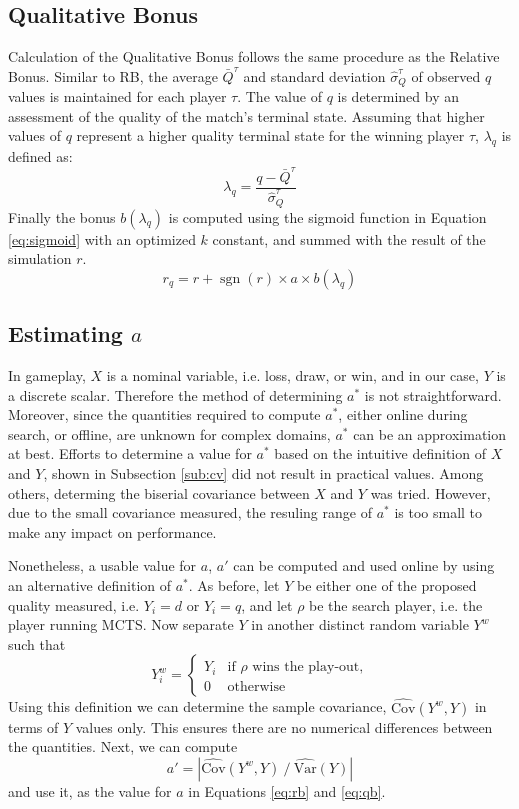 \documentclass{ecai2014}
\newcommand{\sgn}{\mathop{\mathrm{sgn}}}
\newcommand{\SVar}[1]{\mathrm{\widehat{Var}}\left( #1 \right)}
\newcommand{\SCov}[1]{\mathrm{\widehat{Cov}}\left( #1 \right)}
\begin{document}
\subsection{Qualitative Bonus}
\label{subsec:qb}
Calculation of the Qualitative Bonus follows the same procedure as the Relative Bonus. Similar to RB, the average $\bar{Q}^\tau$ and standard deviation $\hat{\sigma}^\tau_Q$ of observed $q$ values is maintained for each player $\tau$. The value of $q$ is determined by an assessment of the quality of the match's terminal state. Assuming that higher values of $q$ represent a higher quality terminal state for the winning player $\tau$, $\lambda_q$ is defined as:
\begin{equation}
\lambda_q = \frac{q - \bar{Q}^\tau}{\hat{\sigma}^\tau_Q}
\label{eq:qb_norm}
\end{equation}
Finally the bonus $b(\lambda_q)$ is computed using the sigmoid function in Equation \ref{eq:sigmoid} with an optimized $k$ constant, and summed with the result of the simulation $r$.
\begin{equation}
r_q=r+\sgn(r)\times a \times b(\lambda_q)
\label{eq:qb}
\end{equation}

\subsection{Estimating $a$}
\label{subsec:astar}
In gameplay, $X$ is a nominal variable, i.e. loss, draw, or win, and in our case, $Y$ is a discrete scalar. Therefore the method of determining $a^*$ is not straightforward. Moreover, since the quantities required to compute $a^*$, either online during search, or offline, are unknown for complex domains, $a^*$ can be an approximation at best. 
Efforts to determine a value for $a^*$ based on the intuitive definition of $X$ and $Y$, shown in Subsection \ref{sub:cv} did not result in practical values. Among others, determing the biserial covariance between $X$ and $Y$ was tried. However, due to the small covariance measured, the resuling range of $a^*$ is too small to make any impact on performance.

Nonetheless, a usable value for $a$, $a'$ can be computed and used online by using an alternative definition of $a^*$. As before, let $Y$ be either one of the proposed quality measured, i.e. $Y_i=d$ or $Y_i=q$, and let $\rho$ be the search player, i.e. the player running MCTS. Now separate $Y$ in another distinct random variable $Y^w$ such that
\begin{equation}
Y^w_i =
\begin{cases}
   Y_i & \text{if $\rho$ wins the play-out,} \\
   0   & \text{otherwise}
\end{cases}
\label{eq:ywin}
\end{equation}
Using this definition we can determine the sample covariance, $\SCov{Y^w,Y}$ in terms of $Y$ values only. This ensures there are no numerical differences between the quantities. Next, we can compute 
\begin{equation}
	a'=\left|{\SCov{Y^w,Y}}\mathbin{/}{\SVar{Y}}\right|
\end{equation}
and use it, as the value for $a$ in Equations \ref{eq:rb} and \ref{eq:qb}. 
\end{document}
